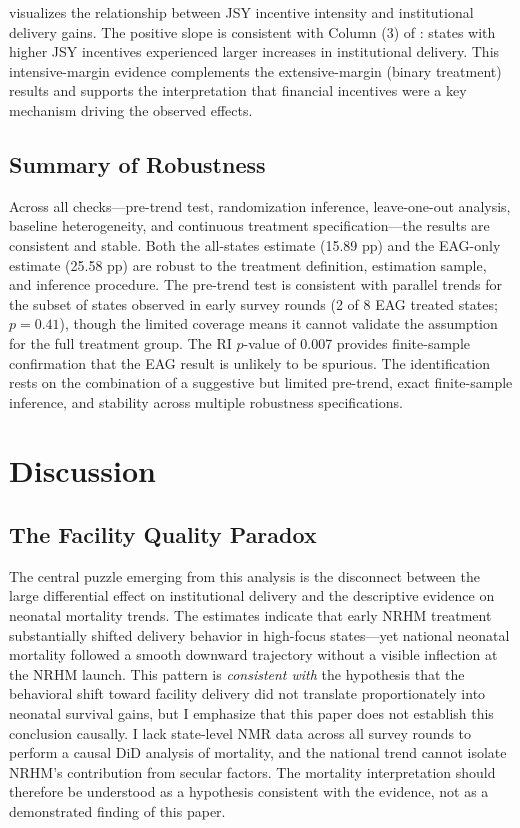 \documentclass[12pt]{article}
\begin{document}
 visualizes the relationship between JSY incentive intensity and institutional delivery gains. The positive slope is consistent with Column (3) of : states with higher JSY incentives experienced larger increases in institutional delivery. This intensive-margin evidence complements the extensive-margin (binary treatment) results and supports the interpretation that financial incentives were a key mechanism driving the observed effects.

\subsection{Summary of Robustness}

Across all checks---pre-trend test, randomization inference, leave-one-out analysis, baseline heterogeneity, and continuous treatment specification---the results are consistent and stable. Both the all-states estimate (15.89 pp) and the EAG-only estimate (25.58 pp) are robust to the treatment definition, estimation sample, and inference procedure. The pre-trend test is consistent with parallel trends for the subset of states observed in early survey rounds (2 of 8 EAG treated states; $p=0.41$), though the limited coverage means it cannot validate the assumption for the full treatment group. The RI $p$-value of 0.007 provides finite-sample confirmation that the EAG result is unlikely to be spurious. The identification rests on the combination of a suggestive but limited pre-trend, exact finite-sample inference, and stability across multiple robustness specifications.


\section{Discussion}
\label{sec:discussion}

\subsection{The Facility Quality Paradox}

The central puzzle emerging from this analysis is the disconnect between the large differential effect on institutional delivery and the descriptive evidence on neonatal mortality trends. The estimates indicate that early NRHM treatment substantially shifted delivery behavior in high-focus states---yet national neonatal mortality followed a smooth downward trajectory without a visible inflection at the NRHM launch. This pattern is \emph{consistent with} the hypothesis that the behavioral shift toward facility delivery did not translate proportionately into neonatal survival gains, but I emphasize that this paper does not establish this conclusion causally. I lack state-level NMR data across all survey rounds to perform a causal DiD analysis of mortality, and the national trend cannot isolate NRHM's contribution from secular factors. The mortality interpretation should therefore be understood as a hypothesis consistent with the evidence, not as a demonstrated finding of this paper.
\end{document}
